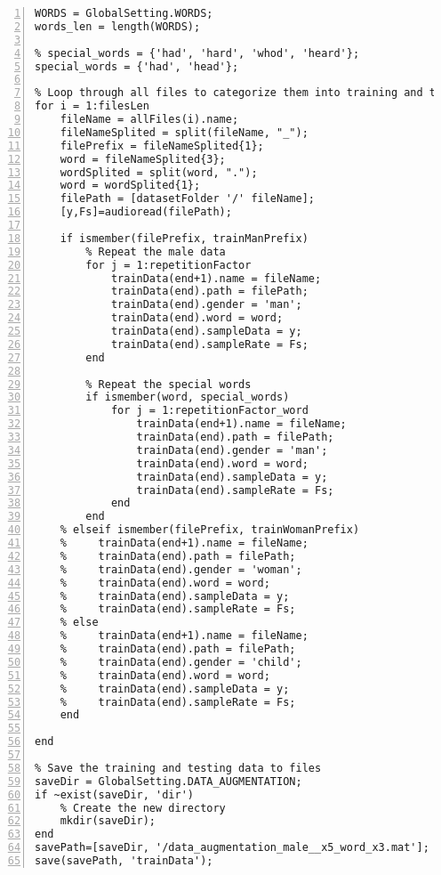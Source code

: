 \documentclass{article}
\begin{document}
\begin{lstlisting}[frame=single, numbers=left, style=Matlab-editor, caption={data\_augmentation.m}, label={lst:data_augmentation}]
% Get all words
WORDS = GlobalSetting.WORDS;
words_len = length(WORDS);

% special_words = {'had', 'hard', 'whod', 'heard'};
special_words = {'had', 'head'};

% Loop through all files to categorize them into training and testing sets.
for i = 1:filesLen
    fileName = allFiles(i).name;
    fileNameSplited = split(fileName, "_");
    filePrefix = fileNameSplited{1};
    word = fileNameSplited{3};
    wordSplited = split(word, ".");
    word = wordSplited{1};
    filePath = [datasetFolder '/' fileName];
    [y,Fs]=audioread(filePath);

    if ismember(filePrefix, trainManPrefix)
        % Repeat the male data
        for j = 1:repetitionFactor
            trainData(end+1).name = fileName;
            trainData(end).path = filePath;
            trainData(end).gender = 'man';
            trainData(end).word = word;
            trainData(end).sampleData = y;
            trainData(end).sampleRate = Fs;
        end

        % Repeat the special words
        if ismember(word, special_words)
            for j = 1:repetitionFactor_word
                trainData(end+1).name = fileName;
                trainData(end).path = filePath;
                trainData(end).gender = 'man';
                trainData(end).word = word;
                trainData(end).sampleData = y;
                trainData(end).sampleRate = Fs;
            end
        end
    % elseif ismember(filePrefix, trainWomanPrefix)
    %     trainData(end+1).name = fileName;
    %     trainData(end).path = filePath;
    %     trainData(end).gender = 'woman';
    %     trainData(end).word = word;
    %     trainData(end).sampleData = y;
    %     trainData(end).sampleRate = Fs;
    % else
    %     trainData(end+1).name = fileName;
    %     trainData(end).path = filePath;
    %     trainData(end).gender = 'child';
    %     trainData(end).word = word;
    %     trainData(end).sampleData = y;
    %     trainData(end).sampleRate = Fs;
    end

end

% Save the training and testing data to files
saveDir = GlobalSetting.DATA_AUGMENTATION;
if ~exist(saveDir, 'dir')
    % Create the new directory
    mkdir(saveDir);
end
savePath=[saveDir, '/data_augmentation_male__x5_word_x3.mat'];
save(savePath, 'trainData');

\end{lstlisting}
\end{document}
